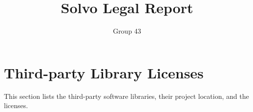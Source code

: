 \documentclass[a4paper]{article}
\begin{document}
    \title{
        \vspace{-3em}
        Solvo Legal Report}
    \author{
        Group 43
    }
    \date{\vspace{-2em}}
    \maketitle


    \section*{Third-party Library Licenses}

    This section lists the third-party software libraries, their project location, and the licenses.

\end{document}
